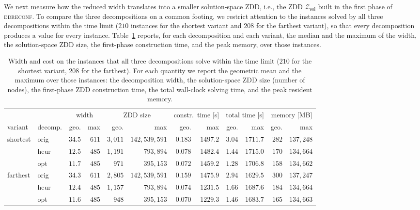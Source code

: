 \documentclass[conference]{IEEEtran}
\newcommand{\zsol}{\mathcal{Z}_{\mathrm{sol}}}
\newcommand{\OrigDecom}{\textsf{orig}\xspace}
\newcommand{\HeurDecom}{\textsf{heur}\xspace}
\newcommand{\OptDecom}{\textsf{opt}\xspace}
\begin{document}
We next measure how the reduced width translates into a smaller solution-space
ZDD, i.e., the ZDD $\zsol$ built in the first phase of \textsc{ddreconf}.
To compare the three decompositions on a common footing, we restrict attention to the
instances solved by all three decompositions within the time limit ($210$ instances for
the shortest variant and $208$ for the farthest variant), so that every decomposition
produces a value for every instance.
Table~\ref{tab:zddsize} reports, for each decomposition and each variant, the
median and the maximum of the width, the solution-space ZDD size, the first-phase
construction time, and the peak memory, over those instances.

\begin{table}[t]
  \centering
  \caption{Width and cost on the instances that all three decompositions solve
  within the time limit ($210$ for the shortest variant, $208$ for the farthest).
  For each quantity we report the geometric mean and the maximum over those
  instances: the decomposition width, the solution-space ZDD size (number of
  nodes), the first-phase ZDD construction time, the total wall-clock solving
  time, and the peak resident memory.}
  \label{tab:zddsize}
  \setlength{\tabcolsep}{4pt}
  \begin{tabular}{ll|rr|rr|rr|rr|rr}
    \hline
    & & \multicolumn{2}{c|}{width} & \multicolumn{2}{c|}{ZDD size}
      & \multicolumn{2}{c|}{constr.\ time [s]} & \multicolumn{2}{c|}{total time [s]}
      & \multicolumn{2}{c}{memory [MB]} \\
    variant & decomp. & geo. & max & geo. & max & geo. & max
      & geo. & max & geo. & max \\
    \hline
    \multirow{3}{*}{shortest}
      & \OrigDecom & $34.5$ & $611$ & $3{,}011$ & $142{,}539{,}591$ & $0.183$ & $1497.2$ & $3.04$ & $1711.7$ & $282$ & $137{,}248$ \\
      & \HeurDecom & $12.5$ & $485$ & $1{,}191$ & $793{,}894$ & $0.078$ & $1482.4$ & $1.44$ & $1715.0$ & $170$ & $134{,}664$ \\
      & \OptDecom  & $11.7$ & $485$ & $971$ & $395{,}153$ & $0.072$ & $1459.2$ & $1.28$ & $1706.8$ & $158$ & $134{,}662$ \\
    \hline
    \multirow{3}{*}{farthest}
      & \OrigDecom & $34.3$ & $611$ & $2{,}805$ & $142{,}539{,}591$ & $0.159$ & $1475.9$ & $2.94$ & $1629.5$ & $300$ & $137{,}247$ \\
      & \HeurDecom & $12.4$ & $485$ & $1{,}157$ & $793{,}894$ & $0.074$ & $1231.5$ & $1.66$ & $1687.6$ & $184$ & $134{,}664$ \\
      & \OptDecom  & $11.6$ & $485$ & $948$ & $395{,}153$ & $0.070$ & $1229.3$ & $1.46$ & $1683.7$ & $165$ & $134{,}663$ \\
    \hline
  \end{tabular}
\end{table}
\end{document}
